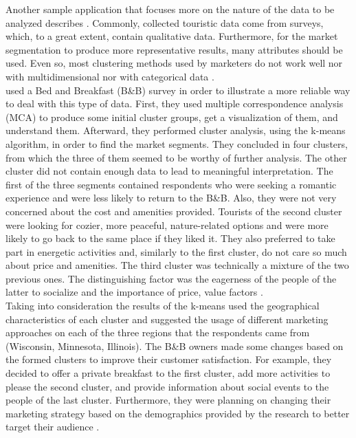 Another sample application that focuses more on the nature of the data to be analyzed describes \textcite{categorical}. Commonly, collected touristic data come from surveys, which, to a great extent, contain qualitative data. Furthermore, for the market segmentation to produce more representative results, many attributes should be used. Even so, most clustering methods used by marketers do not work well nor with multidimensional nor with categorical data \autocite[391]{categorical}. \\
\textcite{categorical} used a Bed and Breakfast (B\&B) survey in order to illustrate a more reliable way to deal with this type of data. First, they used multiple correspondence analysis (MCA) to produce some initial cluster groups, get a visualization of them, and understand them. Afterward, they performed cluster analysis, using the k-means algorithm, in order to find the market segments. They concluded in four clusters, from which the three of them seemed to be worthy of further analysis. The other cluster did not contain enough data to lead to meaningful interpretation. The first of the three segments contained respondents who were seeking a romantic experience and were less likely to return to the B\&B. Also, they were not very concerned about the cost and amenities provided. Tourists of the second cluster were looking for cozier, more peaceful, nature-related options and were more likely to go back to the same place if they liked it. They also preferred to take part in energetic activities and, similarly to the first cluster, do not care so much about price and amenities. The third cluster was technically a mixture of the two previous ones. The distinguishing factor was the eagerness of the people of the latter to socialize and the importance of price, value factors \autocite[394-395]{categorical}. \\
Taking into consideration the results of the k-means \textcite{categorical} used the geographical characteristics of each cluster and suggested the usage of different marketing approaches on each of the three regions that the respondents came from (Wisconsin, Minnesota, Illinois). The B\&B owners made some changes based on the formed clusters to improve their customer satisfaction. For example, they decided to offer a private breakfast to the first cluster, add more activities to please the second cluster, and provide information about social events to the people of the last cluster. Furthermore, they were planning on changing their marketing strategy based on the demographics provided by the research to better target their audience \autocite[395-396]{categorical}.